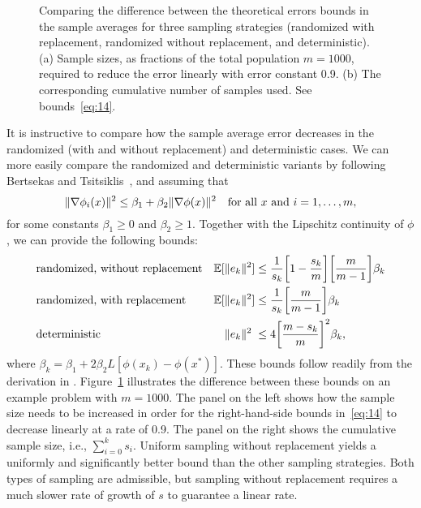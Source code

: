 \documentclass[nospthms]{svjour3}
\numberwithin{equation}{section}
\def\norm#1{\|#1\|}
\def\k{_k}
\def\xstar{x^*}
\def\expval{\mathbb{E}}
\begin{document}
\begin{figure}[t]
  \centering
\caption{Comparing the difference between the theoretical errors bounds in the sample
    averages for three sampling strategies (randomized with replacement, randomized without
    replacement, and deterministic). (a) Sample sizes, as fractions of the total population $m=1000$,
     required to reduce the error linearly with error constant 0.9. (b) The corresponding cumulative
    number of samples used. See bounds~\eqref{eq:14}.}
  \label{fig:sampling}
\end{figure}
It is instructive to compare how the sample average error decreases in the
randomized (with and without replacement) and deterministic cases. We
can more easily compare the randomized and deterministic variants by
following Bertsekas and Tsitsiklis~\cite[\S4.2]{bertsekas1996neuro},
and assuming that
\[
 \norm{\nabla\phi_i(x)}^2 \le \beta_1 + \beta_2\norm{\nabla\phi(x)}^2
 \quad
 \hbox{for all $x$ and $i=1,\ldots,m,$}
\]
for some constants $\beta_1\ge0$ and $\beta_2\ge1$. Together with the
Lipschitz continuity of $\phi$, we can provide the following bounds:
\begin{subequations}
  \label{eq:14}
  \begin{align}
   &\hbox{randomized, without replacement}&
    \expval[\norm{e\k}^2] &\le
    \frac{1}{s\k}\bigg[1-\frac{s\k}{m}\bigg]\bigg[\frac{m}{m-1}\bigg]\beta_k
    \\
    &\hbox{randomized, with replacement}&
    \expval[\norm{e\k}^2] &\le
    \frac{1}{s\k}\bigg[\frac{m}{m-1}\bigg]\beta_k
    \\
    &\hbox{deterministic}&
    \norm{e\k}^2\phantom] &\le
    4\bigg[\frac{m-s\k}{m}\bigg]^2\beta\k,
  \end{align}
\end{subequations}
where $\beta\k = \beta_1 + 2\beta_2 L [\phi(x\k) -
\phi(\xstar)]$. These bounds follow readily from the derivation in
\cite[\S\S3.1--3.2]{FS:2011}. Figure~\ref{fig:sampling} illustrates
the difference between these bounds on an example problem with
$m=1000$. The panel on the left shows how the sample size needs to be
increased in order for the right-hand-side bounds in~\eqref{eq:14} to
decrease linearly at a rate of 0.9. The panel on the right shows the
cumulative sample size, i.e., $\sum_{i=0}^{k} s_i$. Uniform sampling
without replacement yields a uniformly and significantly better bound
than the other sampling strategies.  Both types of sampling are
admissible, but sampling without replacement requires a much slower
rate of growth of $s$ to guarantee a linear rate.
\end{document}
